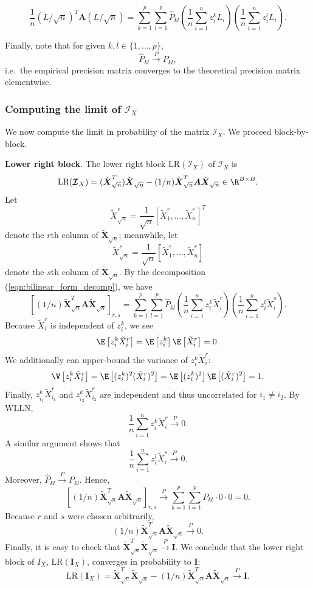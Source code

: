 \documentclass[12pt]{article}
\newcommand{\bs}[1]{\boldsymbol{#1}}
\newcommand{\infomat}{\bs{\mathcal{I}}}
\begin{document}
$$\frac{1}{n} (L/\sqrt{n})^T \bs{A} (L/\sqrt{n}) = \sum_{k=1}^p \sum_{l=1}^p \hat{P}_{kl} \left(\frac{1}{n} \sum_{i=1}^n z_i^k L_i \right) \left( \frac{1}{n} \sum_{i=1}^n z_i^l L_i \right).$$

Finally, note that for given $k,l \in \{1, \dots, p\}$, $$ \hat{P}_{kl} \xrightarrow{P} P_{kl},$$ i.e.\ the empirical precision matrix converges to the theoretical precision matrix elementwise.

\subsubsection*{Computing the limit of $\bs{\mathcal{I}}_X$}

We now compute the limit in probability of the matrix $\infomat_X$. We proceed block-by-block.

\textbf{Lower right block}. The lower right block $\textrm{LR}(\infomat_X)$ of $\infomat_X$ is $$ \textrm{LR}(\infomat_X) = (\tilde{\bs{X}}_{\sqrt{n}}^T)\tilde{\bs{X}}_{\sqrt{n}} - (1/n)\tilde{\bs{X}}^T_{\sqrt{n}} \bs{A} \tilde{\bs{X}}_{\sqrt{n}} \in \R^{B \times B}.$$ Let $$\tilde{X}^r_{\sqrt{n}} = \frac{1}{\sqrt{n}} \left[ \tilde{X}^r_1, \dots, \tilde{X}^r_n \right]^T$$ denote the $r$th column of $\bs{\tilde{X}}_{\sqrt{n}}$; meanwhile, let 
$$ \tilde{X}_{\sqrt{n}}^s = \frac{1}{\sqrt{n}} \left[\tilde{X}^r_1, \dots, \tilde{X}^r_n \right]$$ denote the $s$th column of $\tilde{\bs{X}}_{\sqrt{n}}$. By the decomposition (\ref{eqn:bilinear_form_decomp}), we have
$$\left[ (1/n)\tilde{\bs{X}}^T_{\sqrt{n}} \bs{A} \tilde{\bs{X}}_{\sqrt{n}} \right]_{r,s} =  \sum_{k=1}^p \sum_{l=1}^p \hat{P}_{kl} \left(\frac{1}{n} \sum_{i=1}^n z_i^k \tilde{X}^r_i \right) \left(\frac{1}{n} \sum_{i=1}^n z_i^l \tilde{X}^s_i \right).$$ Because $\tilde{X}^r_i$ is independent of $z^k_i$, we see
$$ \E\left[ z_i^k \tilde{X}^r_i \right] = \E\left[ z_i^k \right] \E\left[ \tilde{X}^r_i \right] = 0.$$ We additionally can upper-bound the variance of $z_i^k \tilde{X}^r_i$:
$$ \V\left[ z^k_i \tilde{X}^r_i \right] = \E\left[ (z_i^k)^2 (\tilde{X}_i^r)^2 \right] = \E\left[ (z_i^k)^2 \right] \E\left[ (\tilde{X}^r_i)^2 \right] = 1.$$ Finally, $z_{i_1}^k \tilde{X}_{i_1}^r$ and  $z_{i_2}^k \tilde{X}_{i_2}^r$ are independent and thus uncorrelated for $i_1 \neq i_2$. By WLLN,
$$\frac{1}{n} \sum_{i=1}^n z_i^k \tilde{X}^r_i \xrightarrow{P} 0.$$ A similar argument shows that
$$ \frac{1}{n} \sum_{i=1}^n z_i^l \tilde{X}^s_i \xrightarrow{P} 0.$$ Moreover,
$\hat{P}_{kl} \xrightarrow{P} P_{kl}.$ Hence,
$$ \left[ (1/n)\tilde{\bs{X}}^T_{\sqrt{n}} \bs{A} \tilde{\bs{X}}_{\sqrt{n}} \right]_{r,s} \xrightarrow{P} \sum_{k=1}^p \sum_{l=1}^p P_{kl} \cdot 0 \cdot 0 = 0.$$ Because $r$ and $s$ were chosen arbitrarily,
$$ (1/n) \tilde{\bs{X}}^T _{\sqrt{n}} \bs{A} \tilde{\bs{X}}_{\sqrt{n}} \xrightarrow{P} 0.$$
Finally, it is easy to check that $\tilde{\bs{X}}^T_{\sqrt{n}}\tilde{\bs{X}}_{\sqrt{n}} \xrightarrow{P} \bs{I}.$ We conclude that the lower right block of $I_X$, $\textrm{LR}(\bs{I}_X)$, converges in probability to $\bs{I}$:
$$\textrm{LR}(\bs{I}_X) = \tilde{\bs{X}}^T_{\sqrt{n}}\tilde{\bs{X}}_{\sqrt{n}} -  (1/n) \tilde{\bs{X}}^T _{\sqrt{n}} \bs{A} \tilde{\bs{X}}_{\sqrt{n}}  \xrightarrow{P} \bs{I}.$$
\end{document}
